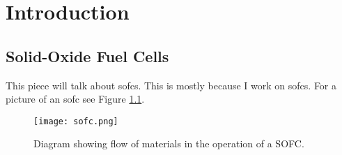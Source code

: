 


\chapter{Introduction}

\section{Solid-Oxide Fuel Cells}

This piece will talk about \glspl{sofc}. This is mostly because I work on \glspl{sofc}. %
For a picture of an \gls{sofc} see Figure \ref{image:sofc}.
\begin{figure}[h]
  \centering
  \texttt{[image: sofc.png]}
  \caption{Diagram showing flow of materials in the operation of a SOFC.\cite{Sakurambo}}
  \label{image:sofc}
\end{figure}

\lipsum\cite{Wang2006a} %
